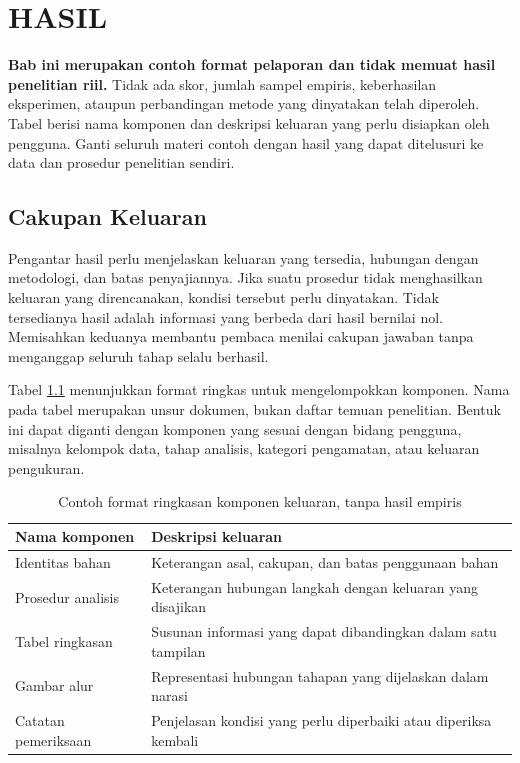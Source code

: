 \chapter{HASIL}
\label{bab:hasil}

\textbf{Bab ini merupakan contoh format pelaporan dan tidak memuat hasil penelitian riil.} Tidak ada skor, jumlah sampel empiris, keberhasilan eksperimen, ataupun perbandingan metode yang dinyatakan telah diperoleh. Tabel berisi nama komponen dan deskripsi keluaran yang perlu disiapkan oleh pengguna. Ganti seluruh materi contoh dengan hasil yang dapat ditelusuri ke data dan prosedur penelitian sendiri.

\section{Cakupan Keluaran}

Pengantar hasil perlu menjelaskan keluaran yang tersedia, hubungan dengan metodologi, dan batas penyajiannya. Jika suatu prosedur tidak menghasilkan keluaran yang direncanakan, kondisi tersebut perlu dinyatakan. Tidak tersedianya hasil adalah informasi yang berbeda dari hasil bernilai nol. Memisahkan keduanya membantu pembaca menilai cakupan jawaban tanpa menganggap seluruh tahap selalu berhasil.

Tabel \ref{tab:contoh-keluaran} menunjukkan format ringkas untuk mengelompokkan komponen. Nama pada tabel merupakan unsur dokumen, bukan daftar temuan penelitian. Bentuk ini dapat diganti dengan komponen yang sesuai dengan bidang pengguna, misalnya kelompok data, tahap analisis, kategori pengamatan, atau keluaran pengukuran.

\begin{table}[htbp]
  \centering
  \caption{Contoh format ringkasan komponen keluaran, tanpa hasil empiris}
  \label{tab:contoh-keluaran}
  \begin{tabular}{p{4.0cm}p{8.6cm}}
    \toprule
    Nama komponen & Deskripsi keluaran \\
    \midrule
    Identitas bahan & Keterangan asal, cakupan, dan batas penggunaan bahan \\
    Prosedur analisis & Keterangan hubungan langkah dengan keluaran yang disajikan \\
    Tabel ringkasan & Susunan informasi yang dapat dibandingkan dalam satu tampilan \\
    Gambar alur & Representasi hubungan tahapan yang dijelaskan dalam narasi \\
    Catatan pemeriksaan & Penjelasan kondisi yang perlu diperbaiki atau diperiksa kembali \\
    \bottomrule
  \end{tabular}
\end{table}

